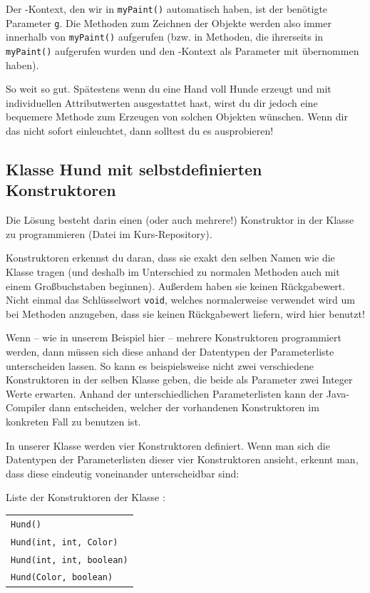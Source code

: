 Der -Kontext, den wir in \lstinline|myPaint()| automatisch
haben, ist der benötigte Parameter \lstinline|g|. Die Methoden zum Zeichnen der
Objekte werden also immer innerhalb von \lstinline|myPaint()| aufgerufen (bzw.
in Methoden, die ihrerseits in \lstinline|myPaint()| aufgerufen wurden und den
-Kontext als Parameter mit übernommen haben).

So weit so gut. Spätestens wenn du eine Hand voll Hunde erzeugt und mit
individuellen Attributwerten ausgestattet hast, wirst du dir jedoch eine
bequemere Methode zum Erzeugen von solchen Objekten wünschen. Wenn dir das nicht
sofort einleuchtet, dann solltest du es ausprobieren!


\subsection{Klasse Hund mit selbstdefinierten Konstruktoren}

Die Lösung besteht darin einen (oder auch mehrere!) Konstruktor in der Klasse
 zu programmieren (Datei  im Kurs-Repository).

Konstruktoren erkennst du daran, dass sie exakt den selben Namen wie die Klasse
tragen (und deshalb im Unterschied zu normalen Methoden auch mit einem
Großbuchstaben beginnen). Außerdem haben sie keinen Rückgabewert. Nicht einmal
das Schlüsselwort \lstinline|void|, welches normalerweise verwendet wird um bei
Methoden anzugeben, dass sie keinen Rückgabewert liefern, wird hier benutzt!

Wenn -- wie in unserem Beispiel hier -- mehrere Konstruktoren programmiert
werden, dann müssen sich diese anhand der Datentypen der Parameterliste
unterscheiden lassen. So kann es beispielsweise nicht zwei verschiedene
Konstruktoren in der selben Klasse geben, die beide als Parameter zwei Integer
Werte erwarten. Anhand der unterschiedlichen Parameterlisten kann der
Java-Compiler dann entscheiden, welcher der vorhandenen Konstruktoren im
konkreten Fall zu benutzen ist.

In unserer Klasse  werden vier Konstruktoren definiert. Wenn man
sich die Datentypen der Parameterlisten dieser vier Konstruktoren ansieht,
erkennt man, dass diese eindeutig voneinander unterscheidbar sind:

Liste der Konstruktoren der Klasse :

\begin{tabular}{l}
\lstinline|Hund()| \\
\lstinline|Hund(int, int, Color)| \\
\lstinline|Hund(int, int, boolean)| \\
\lstinline|Hund(Color, boolean)| \\
\end{tabular}

